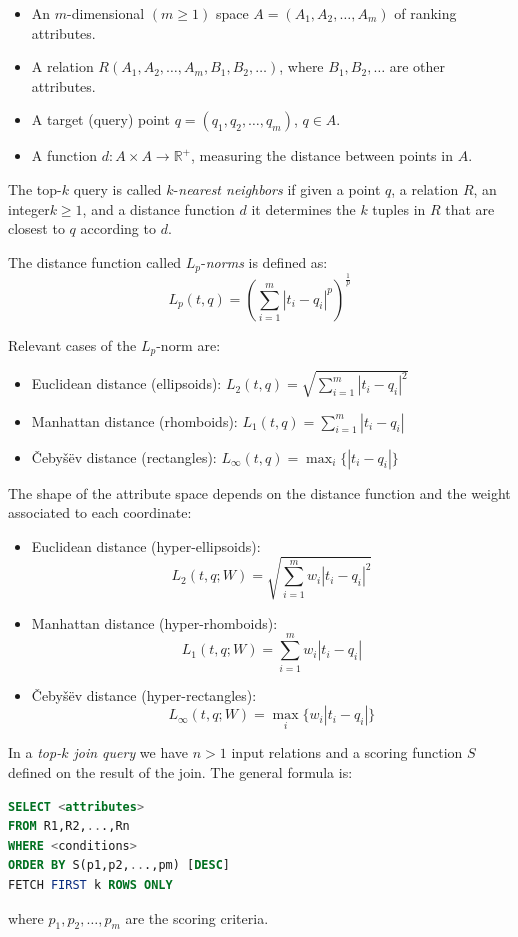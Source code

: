 \documentclass[12pt, a4paper]{report}
\newtheorem[style=M,bodystyle=\normalfont]{theorem}{Theorem}
\newtheorem[style=M,bodystyle=\normalfont]{corollary}{Corollary}
\newtheorem[style=M,bodystyle=\normalfont]{lemma}{Lemma}
\newtheorem[style=M,bodystyle=\normalfont]{definition}{Definition}
\begin{document}
    \begin{itemize}
        \item An $m$-dimensional $(m \geq 1)$ space $A = (A_1,A_2,\dots,A_m)$ of ranking attributes. 
        \item A relation $R(A_1,A_2,\dots,A_m,B_1,B_2,\dots)$, where $B_1,B_2,\dots$ are other attributes.
        \item A target (query) point $q = (q_1,q_2,\dots,q_m)$, $q \in A$. 
        \item A function $d: A \times A \rightarrow \mathbb{R}^{+}$, measuring the distance between points in $A$. 
    \end{itemize}
    \begin{definition}
        The top-$k$ query is called $k$-\emph{nearest neighbors} if given a point $q$, a relation $R$, an integer$k \geq 1$, and a distance function $d$ it determines the $k$ tuples 
        in $R$ that are closest to $q$ according to $d$. 

        The distance function called $L_p$-\emph{norms} is defined as:
        \[L_p(t,q)=\left(\sum_{i=1}^{m}{\left\lvert t_i-q_i \right\rvert^{p}}\right)^{\frac{1}{p}}\]
    \end{definition}
    Relevant cases of the $L_p$-norm are: 
    \begin{itemize}
        \item Euclidean distance (ellipsoids): $L_2(t,q)=\sqrt{\sum_{i=1}^{m}{\left\lvert t_i-q_i \right\rvert^{2}}}$
        \item Manhattan distance (rhomboids): $L_1(t,q)=\sum_{i=1}^{m}{\left\lvert t_i-q_i \right\rvert}$
        \item Čebyšëv distance (rectangles): $L_{\infty}(t,q)=\max_{i}\{\left\lvert t_i-q_i\right\rvert\}$
    \end{itemize}
    The shape of the attribute space depends on the distance function and the weight associated to each coordinate: 
    \begin{itemize}
        \item Euclidean distance (hyper-ellipsoids):
            \[L_2(t,q;W)=\sqrt{\sum_{i=1}^{m}{w_i\left\lvert t_i-q_i \right\rvert^{2}}}\]
        \item Manhattan distance (hyper-rhomboids): 
            \[L_1(t,q;W)=\sum_{i=1}^{m}{w_i\left\lvert t_i-q_i \right\rvert}\]
        \item Čebyšëv distance (hyper-rectangles): 
            \[L_{\infty}(t,q;W)=\max_{i}\{w_i \left\lvert t_i-q_i\right\rvert\}\]
    \end{itemize}
    \begin{definition}
        In a \emph{top-$k$ join query} we have $n > 1$ input relations and a scoring function $S$ defined on the result of the join. The general formula is: 
        \begin{lstlisting}[language=SQL]
SELECT <attributes>
FROM R1,R2,...,Rn
WHERE <conditions>
ORDER BY S(p1,p2,...,pm) [DESC]
FETCH FIRST k ROWS ONLY             
        \end{lstlisting}
        where $p_1,p_2,\dots,p_m$ are the scoring criteria. 
    \end{definition}
\end{document}
